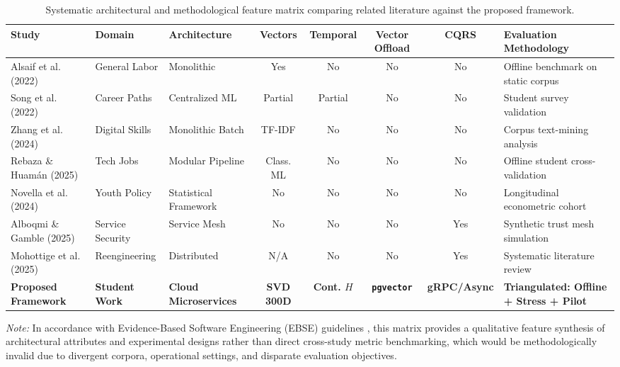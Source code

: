 \documentclass[a4paper,fleqn]{cas-dc}
\begin{document}
\begin{table}[t]
\caption{Systematic architectural and methodological feature matrix comparing related literature against the proposed framework.}
\label{tbl:comparative}
\centering
\scriptsize
\setlength{\tabcolsep}{3.5pt}
\begin{tabularx}{\textwidth}{@{}p{3.2cm} p{2.1cm} p{2.3cm} c c c c X@{}}
\toprule
\textbf{Study} & \textbf{Domain} & \textbf{Architecture} & \textbf{Vectors} & \textbf{Temporal} & \textbf{Vector Offload} & \textbf{CQRS} & \textbf{Evaluation Methodology} \\
\midrule
Alsaif et al. (2022) \cite{alsaif2022} & General Labor & Monolithic & Yes & No & No & No & Offline benchmark on static corpus \\
Song et al. (2022) \cite{song2022} & Career Paths & Centralized ML & Partial & Partial & No & No & Student survey validation \\
Zhang et al. (2024) \cite{zhang2024} & Digital Skills & Monolithic Batch & TF-IDF & No & No & No & Corpus text-mining analysis \\
Rebaza \& Huam{\'a}n (2025) \cite{rebaza2025} & Tech Jobs & Modular Pipeline & Class. ML & No & No & No & Offline student cross-validation \\
Novella et al. (2024) \cite{novella2024} & Youth Policy & Statistical Framework & No & No & No & No & Longitudinal econometric cohort \\
Alboqmi \& Gamble (2025) \cite{alboqmi2025} & Service Security & Service Mesh & No & No & No & Yes & Synthetic trust mesh simulation \\
Mohottige et al. (2025) \cite{mohottige2025} & Reengineering & Distributed & N/A & No & No & Yes & Systematic literature review \\
\midrule
\textbf{Proposed Framework} & \textbf{Student Work} & \textbf{Cloud Microservices} & \textbf{SVD 300D} & \textbf{Cont. $H$} & \textbf{\texttt{pgvector}} & \textbf{gRPC/Async} & \textbf{Triangulated: Offline + Stress + Pilot} \\
\bottomrule
\end{tabularx}
\vspace{1ex}
\parbox{\textwidth}{\scriptsize\textit{Note:} In accordance with Evidence-Based Software Engineering (EBSE) guidelines \cite{kitchenham2009}, this matrix provides a qualitative feature synthesis of architectural attributes and experimental designs rather than direct cross-study metric benchmarking, which would be methodologically invalid due to divergent corpora, operational settings, and disparate evaluation objectives.}
\end{table}
\end{document}

